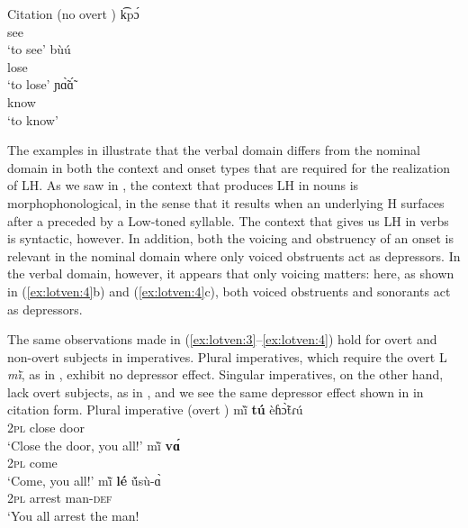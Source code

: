 \documentclass[output=paper
,newtxmath
,modfonts
,nonflat]{langsci/langscibook}
\begin{document}
\ea\label{ex:lotven:4} Citation (no overt )
\ea\label{ex:lotven:4a}
    \gll k͡pɔ́\\
    see    \\
    \glt ‘to see’
\ex\label{ex:lotven:4b}
	\gll bùú\\
    lose\\
    \glt ‘to lose’
\ex\label{ex:lotven:4c}
	\gll ɲɑ̃̀ɑ̃́\\
    know\\
    \glt ‘to know’
\z
\z
                           
The examples in  illustrate that the verbal domain differs from the nominal domain in both the context and onset types that are required for the realization of LH. As we saw in , the context that produces LH  in nouns is morphophonological, in the sense that it results when an underlying H surfaces after a  preceded by a Low-toned syllable. The context that gives us LH in verbs is syntactic, however. In addition, both the voicing and obstruency of an onset is relevant in the nominal domain where only voiced obstruents act as depressors. In the verbal domain, however, it appears that only voicing matters: here, as shown in (\ref{ex:lotven:4}b) and (\ref{ex:lotven:4}c), both voiced obstruents and sonorants act as depressors.

The same observations made in (\ref{ex:lotven:3}–\ref{ex:lotven:4}) hold for overt and non-overt subjects in imperatives. Plural imperatives, which require the overt L   \textit{mĩ̀}, as in , exhibit no depressor effect. Singular imperatives, on the other hand, lack overt subjects, as in , and we see the same depressor effect shown in  in citation form. 
\ea\label{ex:lotven:5} Plural imperative (overt )
\ea\label{ex:lotven:5a}
    \gll mĩ̀ \textbf{tú} èɦɔ̃̀tɾú\\
    2\textsc{pl}  close door    \\
    \glt ‘Close the door, you all!’
\ex\label{ex:lotven:5b}
	\gll mĩ̀ \textbf{vɑ́} \\
    2\textsc{pl} come\\
    \glt ‘Come, you all!’
\ex\label{ex:lotven:5c}
	\gll mĩ̀ \textbf{lé} ṹsù-ɑ̀ \\
    2\textsc{pl}  arrest man-\textsc{def}\\
    \glt ‘You all arrest the man!
\z
\z
 
\end{document}
